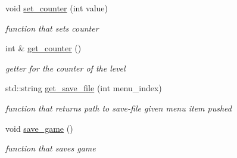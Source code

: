 \begin{DoxyCompactItemize}
void \hyperlink{classfile__management_a291475384add5bdb8002127c71c568ac}{set\+\_\+counter} (int value)
\begin{DoxyCompactList}\small\item\em function that sets counter \end{DoxyCompactList}\item 
int \& \hyperlink{classfile__management_ae6291547fab57a5b861c52e970175854}{get\+\_\+counter} ()
\begin{DoxyCompactList}\small\item\em getter for the counter of the level \end{DoxyCompactList}\item 
std\+::string \hyperlink{classfile__management_a92ece2d05964c828dcb9bf6c59043327}{get\+\_\+save\+\_\+file} (int menu\+\_\+index)
\begin{DoxyCompactList}\small\item\em function that returns path to save-\/file given menu item pushed \end{DoxyCompactList}\item 
void \hyperlink{classfile__management_a79e6ae7cec63aa959d7d0730d6ffa5a3}{save\+\_\+game} ()
\begin{DoxyCompactList}\small\item\em function that saves game \end{DoxyCompactList}\end{DoxyCompactItemize}
